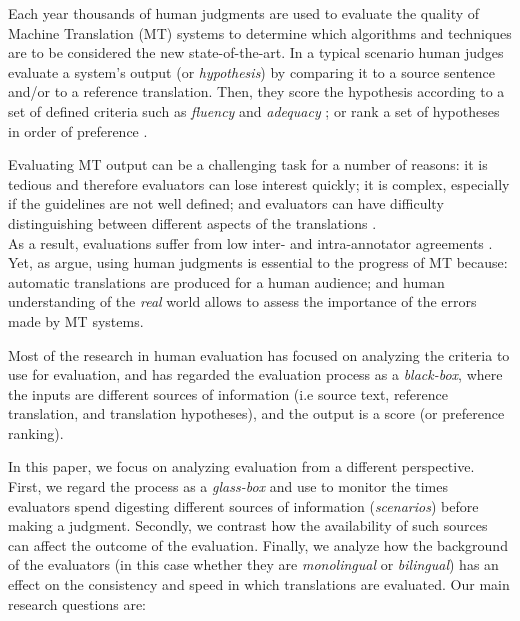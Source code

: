 
Each year thousands of human judgments are used to evaluate the quality of Machine Translation (MT) systems to determine %
which algorithms and techniques are to be considered the new state-of-the-art. 
In a typical scenario 
 human judges evaluate a system's output (or \emph{hypothesis}) by comparing it to a source sentence and/or to a reference translation. Then, they score the hypothesis according to a set of defined criteria such as \emph{fluency} and \emph{adequacy} \cite{white1994}; or rank a set of hypotheses in order of preference \cite{vilar-EtAl:2007:WMT,callisonburch-EtAl:2007:WMT}.

Evaluating MT output can be a challenging task for a number of reasons: it is tedious and therefore evaluators can lose interest quickly; it is complex, especially if the guidelines are not well defined; and evaluators can have difficulty distinguishing between different aspects of the translations \cite{callisonburch-EtAl:2007:WMT}. \\
As a result, evaluations suffer from low inter- and intra-annotator agreements \cite{Turian2003,Snover06astudy}. Yet, as  argue, using human judgments is essential to the progress of MT because: \Ni automatic translations are produced for a human audience; and \Nii human understanding of the \emph{real} world allows to assess the importance of the errors made by MT systems.

Most of the research in human evaluation has focused on analyzing the criteria to use for evaluation, and has regarded the evaluation process as a \emph{black-box}, where the inputs are different sources of information (i.e source text, reference translation, and translation hypotheses), and the output is a score (or preference ranking).

In this paper, we focus on analyzing evaluation from a different perspective. First, we regard the process as a \emph{glass-box} and use \eye to monitor the times evaluators spend digesting different sources of information (\emph{scenarios}) before making a judgment. Secondly, we contrast how the availability of such sources can affect the outcome of the evaluation. Finally, we analyze how the background of the evaluators (in this case whether they are \emph{monolingual} or \emph{bilingual}) has an effect on the consistency and speed in which translations are evaluated. Our main research questions are:

